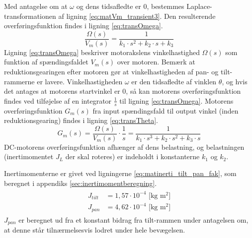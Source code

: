 Med antagelse om at \(\omega\) og dens tidsafledte er 0,
bestemmes Laplace-transformationen af ligning \ref{eq:matVm_transient3}.
Den resulterende overføringsfunktion findes i ligning \ref{eq:transOmega}.
\begin{equation}
	\frac{\Omega\left(s\right)}{V_m\left(s\right)}=\frac{1}{k_1\cdot{}s^2+k_2\cdot{}s+k_3}
	\label{eq:transOmega}
 \end{equation}
Ligning \ref{eq:transOmega} beskriver motorakslens vinkelhastighed \(\Omega\left(s\right)\) som funktion af spændingsfaldet
\(V_m\left(s\right)\) over motoren. Bemærk at reduktionsgearingen efter motoren gør at vinkelhastigheden af pan- og tilt-rammerne er lavere.
Vinkelhastigheden \(\omega\) er den tidsafledte af vinklen \(\theta\),
og hvis det antages at motorens startvinkel er 0, så kan motorens overføringsfunktion
findes ved tilføjelse af en integrator \(\frac{1}{s}\) til ligning \ref{eq:transOmega}.
Motorens overføringsfunktion \(G_m\left(s\right)\) fra input spændingsfald til output vinkel (inden reduktionsgearing) findes
i ligning \ref{eq:transTheta}.
\begin{equation}
	G_m\left(s\right)=\frac{\Omega\left(s\right)}{V_m\left(s\right)}\cdot{}\frac{1}{s}=\frac{1}{k_1\cdot{}s^3+k_2\cdot{}s^2+k_3\cdot{}s}
	\label{eq:transTheta}
\end{equation}
DC-motorens overføringsfunktion afhænger af dens belastning,
og belastningen (inertimomentet \(J_L\) der skal roteres) er indeholdt i konstanterne \(k_1\) og \(k_2\).

Inertimomenterne er givet ved ligningerne \ref{eq:matinerti_tilt_pan_fak},
som beregnet i appendiks \ref{sec:inertimomentberegning}.
\begin{align}
\label{eq:matinerti_tilt_pan_fak}
\begin{split}
{J_{tilt}}&=1,57%
\cdot{10}^{-4} \text{ [kg m$^2$]}
\\
{J_{pan}}&=4,62%
\cdot{10}^{-4} \text{ [kg m$^2$]}
\end{split}
\end{align}
\(J_{pan}\) er beregnet ud fra et konstant bidrag fra tilt-rammen under antagelsen om,
at denne står tilnærmelsesvis lodret under hele bevægelsen.

